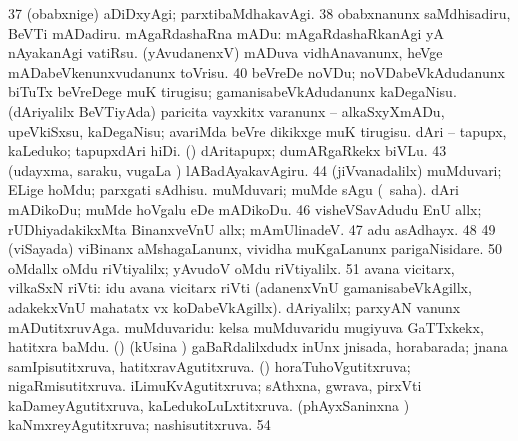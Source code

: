 {\num{37}  (obabxnige) aDiDxyAgi; parxtibaMdhakavAgi. 
\num{38}  obabxnanunx saMdhisadiru, BeVTi mADadiru. 
  mAgaRdashaRna mADu: 
\banum
{} mAgaRdashaRkanAgi yA nAyakanAgi vatiRsu. 
 (yAvudanenxV) mADuva vidhAnavanunx, heVge mADabeVkenunxvudanunx toVrisu. 
\eanum
\numie
\num{40}  
  
\banum
{} beVreDe noVDu; noVDabeVkAdudanunx biTuTx beVreDege muK tirugisu; gamanisabeVkAdudanunx kaDegaNisu. 
 (dAriyalilx BeVTiyAda) paricita vayxkitx \mo varanunx -- alkaSxyXmADu, upeVkiSxsu, kaDegaNisu; avariMda beVre dikikxge muK tirugisu. 
\eanum
\numie
{}  
\banum
{} dAri -- tapupx, kaLeduko; tapupxdAri hiDi. 
 (\rUpa) dAritapupx; dumARgaRkekx biVLu. 
\eanum
\numie
\num{43}  (udayxma, saraku, \mo vugaLa \vi) lABadAyakavAgiru. 
\num{44}  (jiVvanadalilx) muMduvari; ELige hoMdu; parxgati sAdhisu. 
  
\banum
{} muMduvari; muMde sAgu (\rUpa\ saha). 
 dAri mADikoDu; muMde hoVgalu eDe mADikoDu. 
\eanum
\numie
\num{46}  visheVSavAdudu EnU allx; rUDhiyadakikxMta BinanxveVnU allx; mAmUlinadeV. 
\num{47}  adu asAdhayx. 
\num{48}  
\num{49}  (viSayada) viBinanx aMshagaLanunx, vividha muKgaLanunx parigaNisidare. 
\num{50}  oMdallx oMdu riVtiyalilx; yAvudoV oMdu riVtiyalilx. 
\num{51}  avana vicitarx, vilkaSxN riVti:  idu avana vicitarx riVti (adanenxVnU gamanisabeVkAgillx, adakekxVnU mahatatx vx koDabeVkAgillx). 
\banum
{} dAriyalilx; parxyAN \mo vanunx mADutitxruvAga. 
 muMduvaridu: kelsa muMduvaridu mugiyuva GaTTxkekx, hatitxra baMdu. 
 (\AmA) (kUsina \vi) gaBaRdalilxdudx inUnx jnisada, horabarada; jnana samIpisutitxruva, hatitxravAgutitxruva. 
\eanum
\numie
{}  (\AmA) 
\banum
{} horaTuhoVgutitxruva; nigaRmisutitxruva. 
 iLimuKvAgutitxruva; sAthxna, gwrava, pirxVti kaDameyAgutitxruva, kaLedukoLuLxtitxruva. 
 (phAyxSaninxna \vi) kaNmxreyAgutitxruva; nashisutitxruva. 
\eanum
\numie
\num{54}  
}
